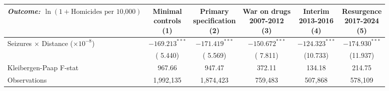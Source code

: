 \begin{tabular}{l c c c c c}
\hline\hline
 {\small \textit{Outcome: $\ln(1+\text{Homicides per 10,000})$}} & \shortstack{Minimal \\ controls \\ (1)} & \shortstack{Primary \\ specification \\ (2)} & \shortstack{War on drugs \\ 2007-2012 \\ (3)} & \shortstack{Interim \\ 2013-2016 \\ (4)} & \shortstack{Resurgence \\ 2017-2024 \\ (5)} \\
\hline
Seizures $\times$ Distance ($\times 10^{-8}$)
 & $-169.213^{***}$ & $-171.419^{***}$ & $-150.672^{***}$ & $-124.323^{***}$ & $-174.930^{***}$ \\
 & ( 5.440) & ( 5.569) & ( 7.811) & (10.733) & (11.937) \\
\hline
Kleibergen-Paap F-stat
 & 967.66 & 947.47 & 372.11 & 134.18 & 214.75 \\
\hline
Observations
 & 1,992,135 & 1,874,423 &   759,483 &   507,868 &   578,109 \\
\hline\hline
\end{tabular}
